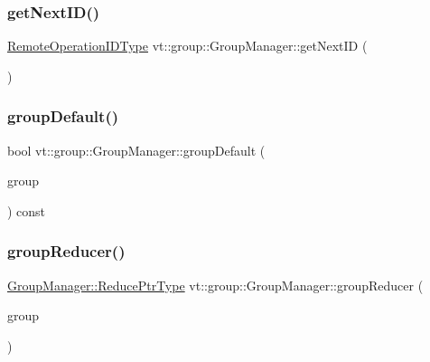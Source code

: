 \mbox{\label{structvt_1_1group_1_1_group_manager_ac8a02606998928c4d688386cddf0d3e0}} 
\subsubsection{\texorpdfstring{get\+Next\+I\+D()}{getNextID()}}
{\footnotesize\ttfamily \hyperlink{namespacevt_1_1group_a73f2624ddeb535b39a08b6524f26b244}{Remote\+Operation\+I\+D\+Type} vt\+::group\+::\+Group\+Manager\+::get\+Next\+ID (\begin{DoxyParamCaption}{ }\end{DoxyParamCaption})}

\mbox{\label{structvt_1_1group_1_1_group_manager_ad9ae779b8223ad458edd62ae5e8a9003}} 
\subsubsection{\texorpdfstring{group\+Default()}{groupDefault()}}
{\footnotesize\ttfamily bool vt\+::group\+::\+Group\+Manager\+::group\+Default (\begin{DoxyParamCaption}\item[{\hyperlink{namespacevt_a27b5e4411c9b6140c49100e050e2f743}{Group\+Type} const \&}]{group }\end{DoxyParamCaption}) const}

\mbox{\label{structvt_1_1group_1_1_group_manager_ab6ee94facc8da1e80e52cf0eda26dc5e}} 
\subsubsection{\texorpdfstring{group\+Reducer()}{groupReducer()}}
{\footnotesize\ttfamily \hyperlink{structvt_1_1group_1_1_group_manager_a0c646983506b624ad93ceb127df9e811}{Group\+Manager\+::\+Reduce\+Ptr\+Type} vt\+::group\+::\+Group\+Manager\+::group\+Reducer (\begin{DoxyParamCaption}\item[{\hyperlink{namespacevt_a27b5e4411c9b6140c49100e050e2f743}{Group\+Type} const \&}]{group }\end{DoxyParamCaption})}


